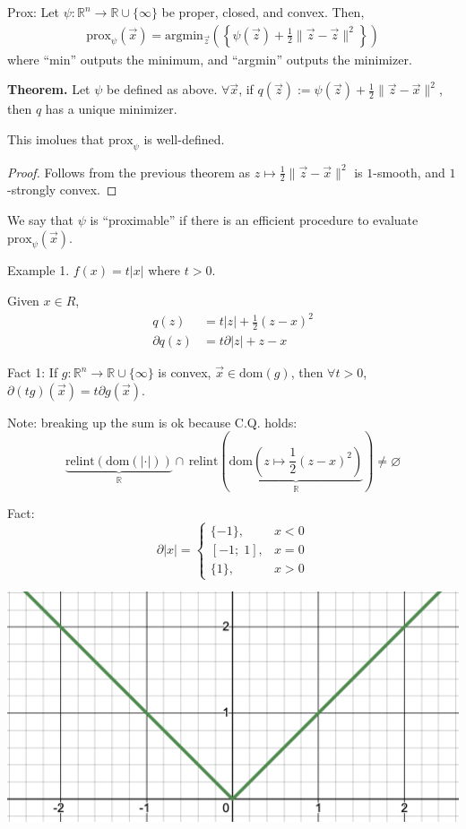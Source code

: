 \documentclass{article}
\newcommand{\R}{\mathbb{R}}             %
\newcommand{\x}{\vec{x}}                %
\newcommand{\z}{\vec{z}}                %
\newcommand{\dom}{\text{dom}}           %
\newcommand{\relint}{\text{relint}}     %
\begin{document}
Prox: Let $\psi \colon \R^n \to \R \cup \{\infty\}$ be proper, closed, and convex. Then,
\begin{align*}
    \text{prox}_{\psi}(\x) = \text{argmin}_{\z}\left(\left\{\psi(\z) + \frac{1}{2}\|\z - \z\|^2\right\}\right)
\end{align*}
where ``min'' outputs the minimum, and ``argmin'' outputs the minimizer.

\textbf{Theorem.} Let $\psi$ be defined as above. $\forall \x$, if $q(\z) := \psi(\z) + \frac{1}{2}\|\z - \x\|^2$, then $q$ has a unique minimizer.

This imolues that $\text{prox}_\psi$ is well-defined.

\begin{proof}
    Follows from the previous theorem as $z \mapsto \frac{1}{2}\|\z - \x\|^2$ is $1$-smooth, and $1$-strongly convex.
\end{proof}

We say that $\psi$ is ``proximable'' if there is an efficient procedure to evaluate $\text{prox}_\psi(\x)$.

Example 1. $f(x) = t|x|$ where $t > 0$.

Given $x \in R$,
\begin{align*}
    q(z) &= t|z| + \frac{1}{2}(z - x)^2 \\
    \partial q(z) &= t\partial |z| + z - x
\end{align*}

Fact 1: If $g \colon \R^n \to \R \cup \{\infty\}$ is convex, $\x \in \dom(g)$, then $\forall t > 0$, $\partial (tg)(\x) = t \partial g(\x)$.

Note: breaking up the sum is ok because C.Q. holds:
\[
    \underbrace{\relint(\dom(|\cdot|))}_{\R} \cap\, \relint\left(\underbrace{\dom\left(z \mapsto \frac{1}{2}(z - x)^2\right)}_{\R}\right) \neq \varnothing
\]

Fact:
\[
    \partial |x| = \begin{cases}
        \{-1\}, & x < 0 \\
        [-1;\; 1], & x = 0 \\
        \{1\}, & x > 0
    \end{cases}
\]

\begin{center}
    \includegraphics[scale=0.4]{abs_x.png}
\end{center}
\end{document}
